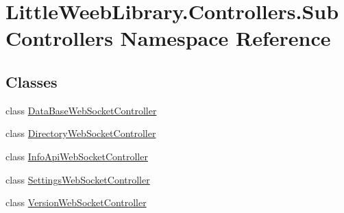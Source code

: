 \hypertarget{namespace_little_weeb_library_1_1_controllers_1_1_sub_controllers}{}\section{Little\+Weeb\+Library.\+Controllers.\+Sub\+Controllers Namespace Reference}
\label{namespace_little_weeb_library_1_1_controllers_1_1_sub_controllers}
\subsection*{Classes}
\begin{DoxyCompactItemize}
\item 
class \mbox{\hyperlink{class_little_weeb_library_1_1_controllers_1_1_sub_controllers_1_1_data_base_web_socket_controller}{Data\+Base\+Web\+Socket\+Controller}}
\item 
class \mbox{\hyperlink{class_little_weeb_library_1_1_controllers_1_1_sub_controllers_1_1_directory_web_socket_controller}{Directory\+Web\+Socket\+Controller}}
\item 
class \mbox{\hyperlink{class_little_weeb_library_1_1_controllers_1_1_sub_controllers_1_1_info_api_web_socket_controller}{Info\+Api\+Web\+Socket\+Controller}}
\item 
class \mbox{\hyperlink{class_little_weeb_library_1_1_controllers_1_1_sub_controllers_1_1_settings_web_socket_controller}{Settings\+Web\+Socket\+Controller}}
\item 
class \mbox{\hyperlink{class_little_weeb_library_1_1_controllers_1_1_sub_controllers_1_1_version_web_socket_controller}{Version\+Web\+Socket\+Controller}}
\end{DoxyCompactItemize}

